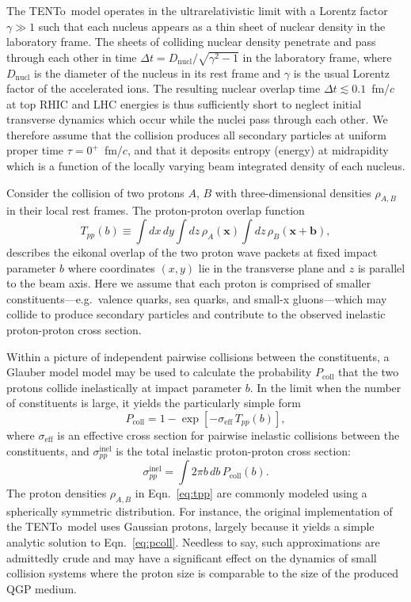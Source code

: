 \documentclass[aps,prc,reprint,amsmath,nofootinbib]{revtex4-1}
\newcommand{\trento}{T\raisebox{-0.5ex}{R}ENTo}
\newcommand{\x}{\mathbf{x}}
\def\\#1{ #1}
\begin{document}
The \trento\ model operates in the ultrarelativistic limit with a Lorentz factor $\gamma \gg 1$ such that each nucleus appears as a thin sheet of nuclear density in the laboratory frame.
The sheets of colliding nuclear density penetrate and pass through each other in time $\Delta t = D_\text{nucl} / \sqrt{\gamma^2 - 1}$ in the laboratory frame, where $D_\text{nucl}$ is the diameter of the nucleus in its rest frame and $\gamma$ is the usual Lorentz factor of the accelerated ions.
The resulting nuclear overlap time $\Delta t \lesssim 0.1$~fm/$c$ at top RHIC and LHC energies is thus sufficiently short to neglect initial transverse dynamics which occur while the nuclei pass through each other.
We therefore assume that the collision produces all secondary particles at uniform proper time $\tau = 0^+$~fm/$c$, and that it deposits entropy (energy) at midrapidity which is a function of the locally varying beam integrated density of each nucleus.

Consider the collision of two protons $A$, $B$ with three-dimensional densities $\rho_{A,B}$ in their local rest frames.
The proton-proton overlap function
\begin{equation}
  \label{eq:tpp}
  T_{pp}(b) \equiv \int dx\, dy \int dz\, \rho_A(\x) \int dz\, \rho_B(\x + \mathbf{b}),
\end{equation}
describes the eikonal overlap of the two proton wave packets at fixed impact parameter $b$ where coordinates $(x, y)$ lie in the transverse plane and $z$ is parallel to the beam axis.
Here we assume that each proton is comprised of smaller constituents---e.g.\ valence quarks, sea quarks, and small-x gluons---which may collide to produce secondary particles and contribute to the observed inelastic proton-proton cross section.

Within a picture of independent pairwise collisions between the constituents, a Glauber model model may be used to calculate the probability $P_\mathrm{coll}$ that the two protons collide inelastically at impact parameter $b$. In the limit when the number of constituents is large, it yields the particularly simple form
\begin{equation}
  \label{eq:pcoll}
  P_\mathrm{coll} = 1 - \exp[-\sigma_\mathrm{eff}\, T_{pp}(b)], \\
\end{equation}
where $\sigma_\mathrm{eff}$ is an effective cross section for pairwise inelastic collisions between the constituents, and $\sigma_{pp}^\mathrm{inel}$ is the total inelastic proton-proton cross section:
\begin{equation}
  \label{eq:sigma_nn}
  \sigma_{pp}^\mathrm{inel} = \int 2 \pi b\, db\, P_\mathrm{coll}(b).
\end{equation}
The proton densities $\rho_{A,B}$ in Eqn.~\eqref{eq:tpp} are commonly modeled using a spherically symmetric distribution.
For instance, the original implementation of the \trento\ model uses Gaussian protons, largely because it yields a simple analytic solution to Eqn.~\eqref{eq:pcoll}.
Needless to say, such approximations are admittedly crude and may have a significant effect on the dynamics of small collision systems where the proton size is comparable to the size of the produced QGP medium.
\end{document}
